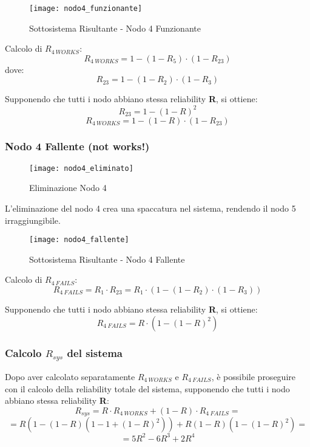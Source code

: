 \clearpage

\begin{figure}[!htbp]
  \centering
  \texttt{[image: nodo4\_funzionante]}
  \caption{Sottosistema Risultante - Nodo 4 Funzionante}
  \label{dep_nodo4_funzionante}
\end{figure}

Calcolo di $R_{4\ WORKS}$:
$$R_{4\ WORKS} = 1-(1-R_5)\cdot(1-R_{23})$$
dove:
$$R_{23} = 1-(1-R_2)\cdot(1-R_3)$$

Supponendo che tutti i nodo abbiano stessa reliability \textbf{R}, si ottiene:
$$R_{23} = 1-(1-R)^2$$
$$R_{4\ WORKS} = 1-(1-R)\cdot(1-R_{23})$$

\clearpage

\subsubsection*{Nodo 4 Fallente (not works!)}

\begin{figure}[!htbp]
  \centering
  \texttt{[image: nodo4\_eliminato]}
  \caption{Eliminazione Nodo 4}
  \label{dep_nodo4_eliminato}
\end{figure}

L'eliminazione del nodo 4 crea una spaccatura nel sistema, rendendo il nodo 5
irraggiungibile.\\

\begin{figure}[!htbp]
  \centering
  \texttt{[image: nodo4\_fallente]}
  \caption{Sottosistema Risultante - Nodo 4 Fallente}
  \label{dep_nodo4_fallente}
\end{figure}

Calcolo di $R_{4\ FAILS}$:
$$R_{4\ FAILS} = R_1 \cdot R_{23} = R_1 \cdot (1-(1-R_2)\cdot(1-R_3))$$

Supponendo che tutti i nodo abbiano stessa reliability \textbf{R}, si ottiene:
$$R_{4\ FAILS} = R \cdot (1-(1-R)^2)$$

\clearpage

\subsubsection{Calcolo $R_{sys}$ del sistema}
Dopo aver calcolato separatamente $R_{4\ WORKS}$ e $R_{4\ FAILS}$, è possibile
proseguire con il calcolo della reliability totale del sistema, supponendo che
tutti i nodo abbiano stessa reliability \textbf{R}:
$$R_{sys} = R \cdot R_{4\ WORKS} + (1-R)\cdot R_{4\ FAILS} =$$
$$= R(1-(1-R)(1-1+(1-R)^2)) + R(1-R)(1-(1-R)^2) =$$
$$= 5R^2-6R^3+2R^4$$

